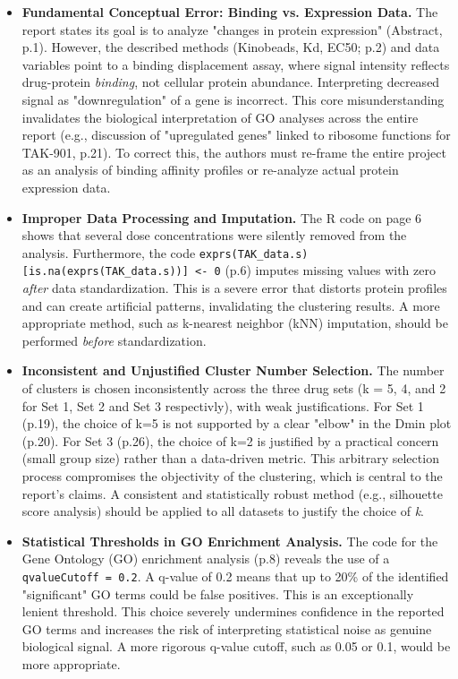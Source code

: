 \documentclass[11pt, a4paper]{article}
\begin{document}
\begin{itemize}
    \item \textbf{Fundamental Conceptual Error: Binding vs. Expression Data.} The report states its goal is to analyze "changes in protein expression" (Abstract, p.1). However, the described methods (Kinobeads, Kd, EC50; p.2) and data variables point to a binding displacement assay, where signal intensity reflects drug-protein \textit{binding}, not cellular protein abundance. Interpreting decreased signal as "downregulation" of a gene is incorrect. This core misunderstanding invalidates the biological interpretation of GO analyses across the entire report (e.g., discussion of "upregulated genes" linked to ribosome functions for TAK-901, p.21). To correct this, the authors must re-frame the entire project as an analysis of binding affinity profiles or re-analyze actual protein expression data.

    \item \textbf{Improper Data Processing and Imputation.} The R code on page 6 shows that several dose concentrations were silently removed from the analysis. Furthermore, the code \texttt{exprs(TAK\_data.s)[is.na(exprs(TAK\_data.s))] <- 0} (p.6) imputes missing values with zero \textit{after} data standardization. This is a severe error that distorts protein profiles and can create artificial patterns, invalidating the clustering results. A more appropriate method, such as k-nearest neighbor (kNN) imputation, should be performed \textit{before} standardization.

    \item \textbf{Inconsistent and Unjustified Cluster Number Selection.} The number of clusters is chosen inconsistently across the three drug sets (k = 5, 4, and 2 for Set 1, Set 2 and Set 3 respectivly), with weak justifications. For Set 1 (p.19), the choice of k=5 is not supported by a clear "elbow" in the Dmin plot (p.20). For Set 3 (p.26), the choice of k=2 is justified by a practical concern (small group size) rather than a data-driven metric. This arbitrary selection process compromises the objectivity of the clustering, which is central to the report's claims. A consistent and statistically robust method (e.g., silhouette score analysis) should be applied to all datasets to justify the choice of \textit{k}.

    \item \textbf{Statistical Thresholds in GO Enrichment Analysis.} The code for the Gene Ontology (GO) enrichment analysis (p.8) reveals the use of a \texttt{qvalueCutoff = 0.2}. A q-value of 0.2 means that up to 20\% of the identified "significant" GO terms could be false positives. This is an exceptionally lenient threshold. This choice severely undermines confidence in the reported GO terms and increases the risk of interpreting statistical noise as genuine biological signal. A more rigorous q-value cutoff, such as 0.05 or 0.1, would be more appropriate.
\end{itemize}
\end{document}
